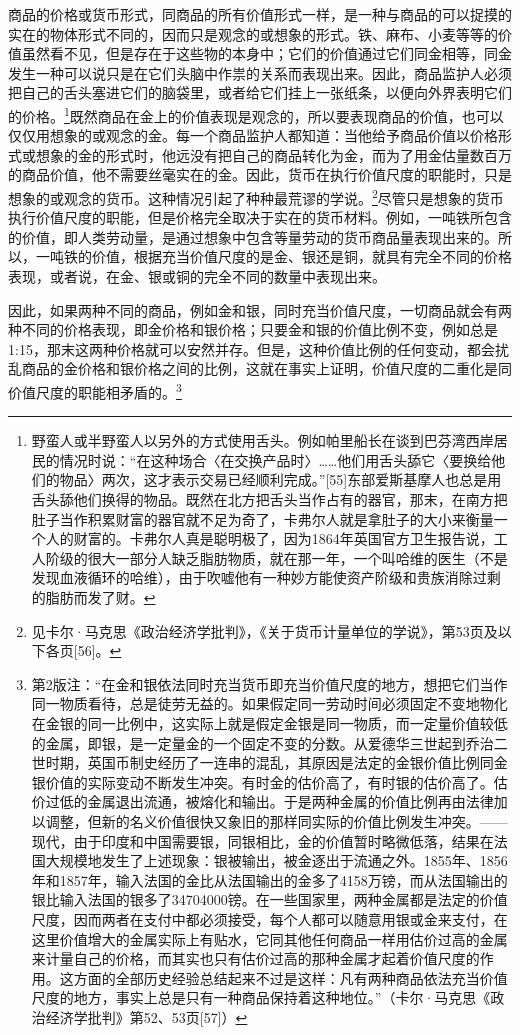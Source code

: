 \documentclass{ctexbook}
\begin{document}
    商品的价格或货币形式，同商品的所有价值形式一样，是一种与商品的可以捉摸的实在的物体形式不同的，因而只是观念的或想象的形式。铁、麻布、小麦等等的价值虽然看不见，但是存在于这些物的本身中；它们的价值通过它们同金相等，同金发生一种可以说只是在它们头脑中作祟的关系而表现出来。因此，商品监护人必须把自己的舌头塞进它们的脑袋里，或者给它们挂上一张纸条，以便向外界表明它们的价格。\footnote{野蛮人或半野蛮人以另外的方式使用舌头。例如帕里船长在谈到巴芬湾西岸居民的情况时说：“在这种场合〈在交换产品时〉……他们用舌头舔它〈要换给他们的物品〉两次，这才表示交易已经顺利完成。”[55]东部爱斯基摩人也总是用舌头舔他们换得的物品。既然在北方把舌头当作占有的器官，那末，在南方把肚子当作积累财富的器官就不足为奇了，卡弗尔人就是拿肚子的大小来衡量一个人的财富的。卡弗尔人真是聪明极了，因为1864年英国官方卫生报告说，工人阶级的很大一部分人缺乏脂肪物质，就在那一年，一个叫哈维的医生（不是发现血液循环的哈维），由于吹嘘他有一种妙方能使资产阶级和贵族消除过剩的脂肪而发了财。}既然商品在金上的价值表现是观念的，所以要表现商品的价值，也可以仅仅用想象的或观念的金。每一个商品监护人都知道：当他给予商品价值以价格形式或想象的金的形式时，他远没有把自己的商品转化为金，而为了用金估量数百万的商品价值，他不需要丝毫实在的金。因此，货币在执行价值尺度的职能时，只是想象的或观念的货币。这种情况引起了种种最荒谬的学说。\footnote{见卡尔·马克思《政治经济学批判》，《关于货币计量单位的学说》，第53页及以下各页[56]。}尽管只是想象的货币执行价值尺度的职能，但是价格完全取决于实在的货币材料。例如，一吨铁所包含的价值，即人类劳动量，是通过想象中包含等量劳动的货币商品量表现出来的。所以，一吨铁的价值，根据充当价值尺度的是金、银还是铜，就具有完全不同的价格表现，或者说，在金、银或铜的完全不同的数量中表现出来。

    因此，如果两种不同的商品，例如金和银，同时充当价值尺度，一切商品就会有两种不同的价格表现，即金价格和银价格；只要金和银的价值比例不变，例如总是1:15，那末这两种价格就可以安然并存。但是，这种价值比例的任何变动，都会扰乱商品的金价格和银价格之间的比例，这就在事实上证明，价值尺度的二重化是同价值尺度的职能相矛盾的。\footnote{第2版注：“在金和银依法同时充当货币即充当价值尺度的地方，想把它们当作同一物质看待，总是徒劳无益的。如果假定同一劳动时间必须固定不变地物化在金银的同一比例中，这实际上就是假定金银是同一物质，而一定量价值较低的金属，即银，是一定量金的一个固定不变的分数。从爱德华三世起到乔治二世时期，英国币制史经历了一连串的混乱，其原因是法定的金银价值比例同金银价值的实际变动不断发生冲突。有时金的估价高了，有时银的估价高了。估价过低的金属退出流通，被熔化和输出。于是两种金属的价值比例再由法律加以调整，但新的名义价值很快又象旧的那样同实际的价值比例发生冲突。——现代，由于印度和中国需要银，同银相比，金的价值暂时略微低落，结果在法国大规模地发生了上述现象：银被输出，被金逐出于流通之外。1855年、1856年和1857年，输入法国的金比从法国输出的金多了4158万镑，而从法国输出的银比输入法国的银多了34704000镑。在一些国家里，两种金属都是法定的价值尺度，因而两者在支付中都必须接受，每个人都可以随意用银或金来支付，在这里价值增大的金属实际上有贴水，它同其他任何商品一样用估价过高的金属来计量自己的价格，而其实也只有估价过高的那种金属才起着价值尺度的作用。这方面的全部历史经验总结起来不过是这样：凡有两种商品依法充当价值尺度的地方，事实上总是只有一种商品保持着这种地位。”（卡尔·马克思《政治经济学批判》第52、53页[57]）}
\end{document}
